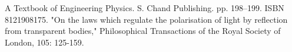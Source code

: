 \documentclass[]{report}
\begin{document}
\begin{thebibliography}{0}
	A Textbook of Engineering Physics. S. Chand Publishing. pp. 198–199. ISBN 8121908175.
	"On the laws which regulate the polarisation of light by reflection from transparent bodies," Philosophical Transactions of the Royal Society of London, 105: 125-159.	
\end{thebibliography}
\end{document}
